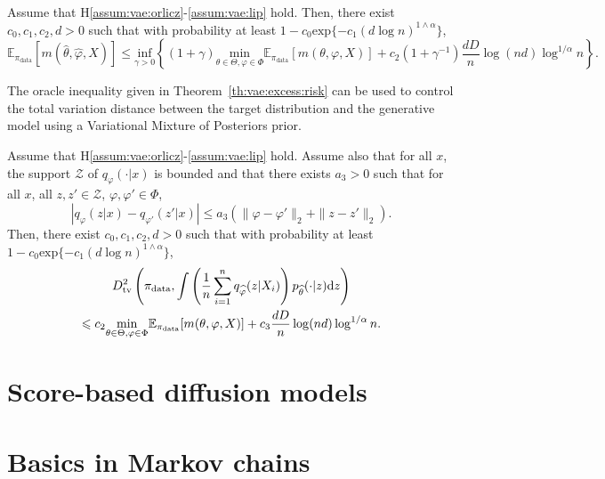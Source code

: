 \documentclass[english,graybox,envcountchap,envcountsame,sectrefs,shortlabels]{svmono}
\theoremstyle{style}
\renewenvironment{keywords}{\textit{\bf Keywords: } \sffamily }{}
\newcommand{\eqsp}{}
\begin{document}
\begin{theorem}
\label{th:vae:excess:risk}
Assume that H\ref{assum:vae:orlicz}-\ref{assum:vae:lip} hold. Then, there exist $c_0,c_1,c_2,d>0$ such that with probability at least $1- c_0 \mathrm{exp}\{-c_1(d\log n)^{1\wedge \alpha}\}$,
$$
\mathbb{E}_{\pi_{\mathrm{data}}}\left[m(\widehat \theta,\widehat\varphi,X)\right]\leqslant \underset{\gamma>0}{\mathrm{inf}}\left\{(1+\gamma) \underset{\theta\in\Theta,\varphi\in\Phi}{\mathrm{min}}\mathbb{E}_{\pi_{\mathrm{data}}}[m(\theta,\varphi,X)] + c_2(1+\gamma^{-1})\frac{dD}{n}\log(nd)\log^{1/\alpha}n\right\}\eqsp.
$$
\end{theorem}
The oracle inequality given in Theorem~\ref{th:vae:excess:risk} can be used to control the total variation distance between the target distribution and the generative model  using a Variational Mixture of Posteriors prior.
\begin{proposition}
\label{prop:vaemixtprior}
Assume that H\ref{assum:vae:orlicz}-\ref{assum:vae:lip} hold. Assume also that for all $x$, the support $\mathcal{Z}$ of $q_\varphi(\cdot|x)$ is bounded and that there exists $a_3>0$ such that for all $x$, all $z,z'\in \mathcal{Z}$, $\varphi,\varphi'\in\Phi$,
$$
\left|q_\varphi(z|x) - q_{\varphi'}(z'|x)\right| \leqslant a_3 \left( \|\varphi-\varphi'\|_2 + \|z-z'\|_2\right)\eqsp.
$$
Then, there exist $c_0,c_1,c_2,d>0$ such that with probability at least $1- c_0 \mathrm{exp}\{-c_1(d\log n)^{1\wedge \alpha}\}$,
\begin{multline*}
D_{\mathrm{tv}}^2\left(\pi_{\mathrm{data}},\int \left(\frac{1}{n}\sum_{i=1}^n q_{\widehat \varphi}(z|X_i)\right)p_{\widehat \theta}(\cdot|z)\rmd z\right)\\
\leqslant c_2 \underset{\theta\in\Theta,\varphi\in\Phi}{\mathrm{min}}\mathbb{E}_{\pi_{\mathrm{data}}}[m(\theta,\varphi,X)] + c_3\frac{dD}{n}\log(nd)\log^{1/\alpha}n\eqsp.
\end{multline*}
\end{proposition}

\chapter{Score-based diffusion models}
\minitoc



\chapter{Basics in Markov chains}
\minitoc
\end{document}
